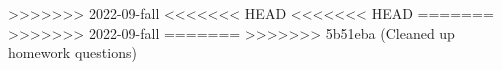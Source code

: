 \documentclass{../../oss-apphys-exam}
\begin{document}
\begin{multicols*}{2}
\begin{questions}
\begin{choices}
\begin{choices}
>>>>>>> 2022-09-fall
%      
<<<<<<< HEAD
<<<<<<< HEAD
=======
>>>>>>> 2022-09-fall
=======
>>>>>>> 5b51eba (Cleaned up homework questions)
%

\end{choices}
\end{choices}
\end{questions}
\end{multicols*}
\end{document}
